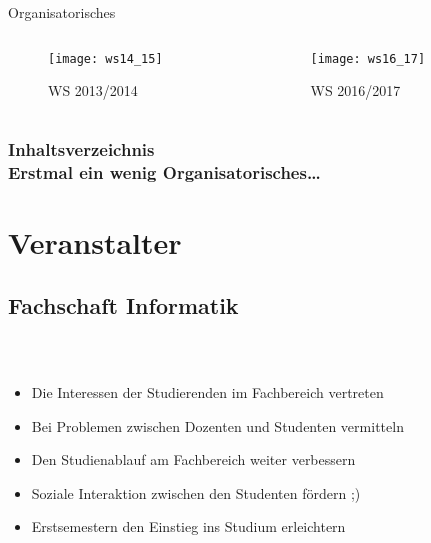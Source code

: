 

\usepackage{listings}
\usepackage{tikz}



\begin{titleframe}
	\begin{center}
		{\huge Organisatorisches}
	\end{center}
	\vspace{-5mm}
	\begin{columns}
		\begin{column}{6cm}
			\begin{figure}
				\centering
				\texttt{[image: ws14\_15]}
				\caption{WS 2013/2014}
			\end{figure}
		\end{column}
		\begin{column}{6cm}
			\begin{figure}
				\centering
				\texttt{[image: ws16\_17]}
				\caption{WS 2016/2017}
			\end{figure}
		\end{column}
	\end{columns}

\end{titleframe}

\begin{frame}[t]
	\frametitle{Inhaltsverzeichnis \\ {\small Erstmal ein wenig Organisatorisches…}}
	{\small	\tableofcontents[subsectionstyle=shaded]}
\end{frame}


\section{Veranstalter}
\subsection*{Fachschaft Informatik}
\begin{frame}
	\frametitle{\insertsectionhead \\ {\small \insertsubsectionhead}}
	\begin{itemize}
		\item Die Interessen der Studierenden im Fachbereich vertreten
		\item Bei Problemen zwischen Dozenten und Studenten vermitteln
		\item Den Studienablauf am Fachbereich weiter verbessern
		\item Soziale Interaktion zwischen den Studenten fördern ;)
		\item Erstsemestern den Einstieg ins Studium erleichtern
	\end{itemize}
\end{frame}

